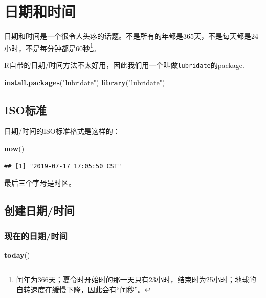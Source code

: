 \documentclass[]{book}
\newenvironment{Shaded}{\begin{snugshade}}{\end{snugshade}}
\newcommand{\KeywordTok}[1]{\textcolor[rgb]{0.13,0.29,0.53}{\textbf{#1}}}
\newcommand{\NormalTok}[1]{#1}
\newcommand{\StringTok}[1]{\textcolor[rgb]{0.31,0.60,0.02}{#1}}
\let\rmarkdownfootnote\footnote%
\def\footnote{\protect\rmarkdownfootnote}
\begin{document}
\hypertarget{dttm}{%
\section{日期和时间}\label{dttm}}

日期和时间是一个很令人头疼的话题。不是所有的年都是365天，不是每天都是24小时，不是每分钟都是60秒\footnote{闰年为366天；夏令时开始时的那一天只有23小时，结束时为25小时；地球的自转速度在缓慢下降，因此会有``闰秒''。}。

R自带的日期/时间方法不太好用，因此我们用一个叫做\texttt{lubridate}的package.

\begin{Shaded}
\begin{Highlighting}[]
\KeywordTok{install.packages}\NormalTok{(}\StringTok{"lubridate"}\NormalTok{)}
\KeywordTok{library}\NormalTok{(}\StringTok{"lubridate"}\NormalTok{)}
\end{Highlighting}
\end{Shaded}

\hypertarget{iso}{%
\subsection{ISO标准}\label{iso}}

日期/时间的ISO标准格式是这样的：

\begin{Shaded}
\begin{Highlighting}[]
\KeywordTok{now}\NormalTok{()}
\end{Highlighting}
\end{Shaded}

\begin{verbatim}
## [1] "2019-07-17 17:05:50 CST"
\end{verbatim}

最后三个字母是时区。

\subsection{创建日期/时间}

\subsubsection{现在的日期/时间}

\begin{Shaded}
\begin{Highlighting}[]
\KeywordTok{today}\NormalTok{()}
\end{Highlighting}
\end{Shaded}
\end{document}
